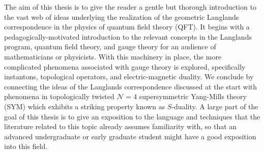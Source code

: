 The aim of this thesis is to give the reader a gentle but thorough introduction to the vast web of ideas underlying the realization of the geometric Langlands correspondence in the physics of quantum field theory (QFT). It begins with a pedagogically-motivated introduction to the relevant concepts in the Langlands program, quantum field theory, and gauge theory for an audience of mathematicians or physicists. With this machinery in place, the more complicated phenomena associated with gauge theory is explored, specifically instantons, topological operators, and electric-magnetic duality. We conclude by connecting the ideas of the Langlands correspondence discussed at the start with phenomena in topologically twisted $\mathcal N = 4$ supersymmetric Yang-Mills theory (SYM) which exhibits a striking property known as $S$-duality. A large part of the goal of this thesis is to give an exposition to the language and techniques that the literature related to this topic already assumes familiarity with, so that an advanced undergraduate or early graduate student might have a good exposition into this field. 